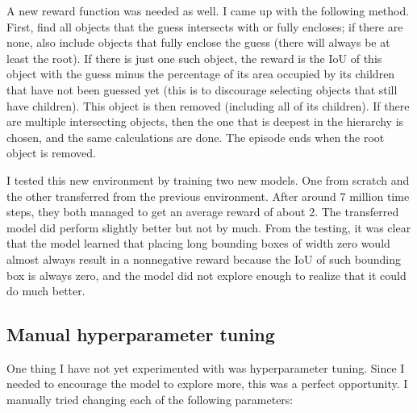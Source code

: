 \documentclass[
  digital,     %
  oneside,     %
  nosansbold,  %
  nocolorbold, %
  lof,         %
  lot,         %
]{fithesis4}
\begin{document}
A new reward function was needed as well. I came up with the following method. First, find all objects that the guess intersects with or fully encloses; if there are none, also include objects that fully enclose the guess (there will always be at least the root). If there is just one such object, the reward is the IoU of this object with the guess minus the percentage of its area occupied by its children that have not been guessed yet (this is to discourage selecting objects that still have children). This object is then removed (including all of its children). If there are multiple intersecting objects, then the one that is deepest in the hierarchy is chosen, and the same calculations are done. The episode ends when the root object is removed.

I tested this new environment by training two new models. One from scratch and the other transferred from the previous environment. After around 7 million time steps, they both managed to get an average reward of about 2. The transferred model did perform slightly better but not by much. From the testing, it was clear that the model learned that placing long bounding boxes of width zero would almost always result in a nonnegative reward because the IoU of such bounding box is always zero, and the model did not explore enough to realize that it could do much better.

\subsection{Manual hyperparameter tuning}

One thing I have not yet experimented with was hyperparameter tuning. Since I needed to encourage the model to explore more, this was a perfect opportunity. I manually tried changing each of the following parameters:
\end{document}

